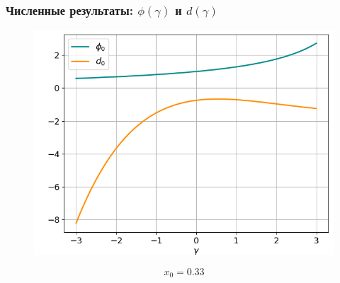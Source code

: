 \documentclass[fullscreen=true, unicode, bookmarks=false]{beamer}
\begin{document}
\begin{frame}
\frametitle{ Численные результаты: $ \phi(\gamma) $ и $ d(\gamma) $ }

\begin{figure} 
\includegraphics[scale=0.55]{divergent_phi0d0_13.png}  
\end{figure}

$$ x_0 = 0.33 $$

\end{frame}
\end{document}
